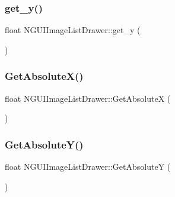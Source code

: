 \hypertarget{class_n_g_u_i_image_list_drawer_a5513cf7543ee09b69b7d2430c683a51c}{}\label{class_n_g_u_i_image_list_drawer_a5513cf7543ee09b69b7d2430c683a51c} 
\subsubsection{\texorpdfstring{get\+\_\+y()}{get\_y()}}
{\footnotesize\ttfamily float N\+G\+U\+I\+Image\+List\+Drawer\+::get\+\_\+y (\begin{DoxyParamCaption}{ }\end{DoxyParamCaption})}

\hypertarget{class_n_g_u_i_image_list_drawer_a20c79252cba7958a49023edd8ceb690b}{}\label{class_n_g_u_i_image_list_drawer_a20c79252cba7958a49023edd8ceb690b} 
\subsubsection{\texorpdfstring{Get\+Absolute\+X()}{GetAbsoluteX()}}
{\footnotesize\ttfamily float N\+G\+U\+I\+Image\+List\+Drawer\+::\+Get\+AbsoluteX (\begin{DoxyParamCaption}{ }\end{DoxyParamCaption})}

\hypertarget{class_n_g_u_i_image_list_drawer_a988fbd6dc13de2390a45672dd66c1471}{}\label{class_n_g_u_i_image_list_drawer_a988fbd6dc13de2390a45672dd66c1471} 
\subsubsection{\texorpdfstring{Get\+Absolute\+Y()}{GetAbsoluteY()}}
{\footnotesize\ttfamily float N\+G\+U\+I\+Image\+List\+Drawer\+::\+Get\+AbsoluteY (\begin{DoxyParamCaption}{ }\end{DoxyParamCaption})}

\hypertarget{class_n_g_u_i_image_list_drawer_a4c71e6c4943261a7ddb9b5912eec1c70}{}\label{class_n_g_u_i_image_list_drawer_a4c71e6c4943261a7ddb9b5912eec1c70} 
